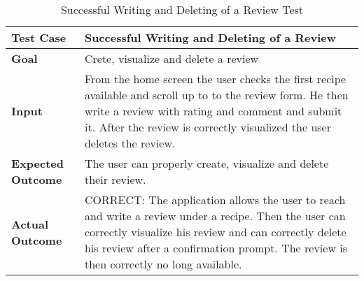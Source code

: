 \begin{table}[H]
	\centering
	\begin{tabular}{|l|l|}
		\hline
		\textbf{Test Case}& Successful Writing and Deleting of a Review\\
		\hline
		\textbf{Goal}& Crete, visualize and delete a review\\
		\hline
		\textbf{Input}& 
		\begin{minipage}{.7\linewidth}
			From the home screen the user checks the first recipe available and scroll up to to the review form. He then write a review with rating and comment and submit it. After the review is correctly visualized the user deletes the review.
		\end{minipage}\\
		\hline
		\textbf{Expected Outcome}& The user can properly create, visualize and delete their review.\\
		\hline
		\textbf{Actual Outcome}& 
		\begin{minipage}{.7\linewidth}
			CORRECT: The application allows the user to reach and write a review under a recipe. Then the user can correctly visualize his review and can correctly delete his review after a confirmation prompt. The review is then correctly no long available.
		\end{minipage}\\
		\hline	
	\end{tabular}
	\caption{Successful Writing and Deleting of a Review Test}
\end{table}

